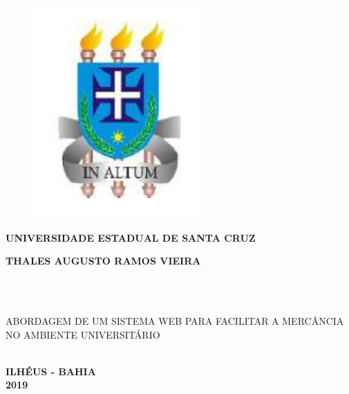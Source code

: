 \thispagestyle{empty}

\vfill
 \begin{center}
    
    \begin{figure}
	   \centering
	   		\includegraphics[scale=0.35]{figs/brasao_uesc.png} 
    \end{figure}
    
    {\large\bfseries UNIVERSIDADE ESTADUAL DE SANTA CRUZ} \\
    
   

    \vspace*{1in}
    \begin{large} \bfseries THALES AUGUSTO RAMOS VIEIRA \end{large}\\[0.4in]

    \vspace*{4cm}
    \noindent \\
    
    \large\bfseries{\begin{large}ABORDAGEM DE UM SISTEMA WEB PARA FACILITAR A MERCÂNCIA NO AMBIENTE UNIVERSITÁRIO \end{large}} \\
    \vfill
    \large\bfseries{ ILHÉUS - BAHIA \\ 2019}
\end{center}

\normalsize


